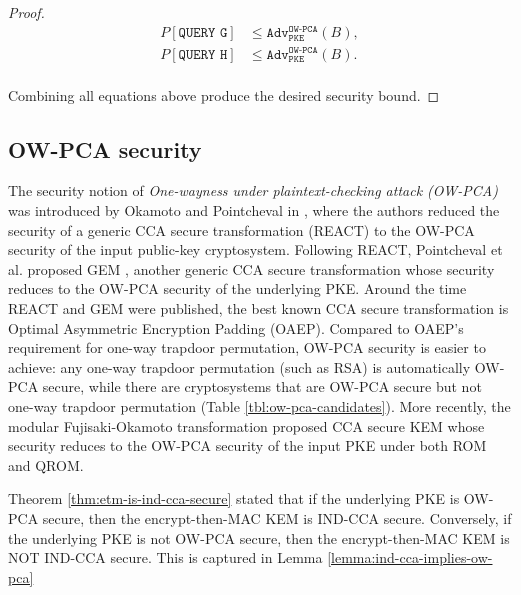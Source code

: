 \documentclass[runningheads]{llncs}
\newcommand{\pke}{\texttt{PKE}}
\newcommand{\adv}{\texttt{Adv}}
\begin{document}
\begin{proof}
    \begin{equation*}
        \begin{aligned}
            P\left[\texttt{QUERY G}\right] &\leq \adv^\texttt{OW-PCA}_\pke(B), \\
            P\left[\texttt{QUERY H}\right] &\leq \adv^\texttt{OW-PCA}_\pke(B). \\
        \end{aligned}
    \end{equation*}

    Combining all equations above produce the desired security bound.
\end{proof}

\subsection{OW-PCA security}\label{sec:ow-pca-security}
The security notion of \textit{One-wayness under plaintext-checking attack (OW-PCA)} was introduced by Okamoto and Pointcheval in \cite{DBLP:conf/ctrsa/OkamotoP01}, where the authors reduced the security of a generic CCA secure transformation (REACT) to the OW-PCA security of the input public-key cryptosystem. Following REACT, Pointcheval et al. proposed GEM \cite{DBLP:conf/ctrsa/CoronHJPPT02}, another generic CCA secure transformation whose security reduces to the OW-PCA security of the underlying PKE. Around the time REACT and GEM were published, the best known CCA secure transformation is Optimal Asymmetric Encryption Padding (OAEP)\cite{DBLP:conf/eurocrypt/BellareR94}. Compared to OAEP's requirement for one-way trapdoor permutation, OW-PCA security is easier to achieve: any one-way trapdoor permutation (such as RSA) is automatically OW-PCA secure, while there are cryptosystems that are OW-PCA secure but not one-way trapdoor permutation (Table \ref{tbl:ow-pca-candidates}). More recently, the modular Fujisaki-Okamoto transformation \cite{DBLP:conf/tcc/HofheinzHK17} proposed CCA secure KEM whose security reduces to the OW-PCA security of the input PKE under both ROM and QROM.

Theorem \ref{thm:etm-is-ind-cca-secure} stated that if the underlying PKE is OW-PCA secure, then the encrypt-then-MAC KEM is IND-CCA secure. Conversely, if the underlying PKE is not OW-PCA secure, then the encrypt-then-MAC KEM is NOT IND-CCA secure. This is captured in Lemma \ref{lemma:ind-cca-implies-ow-pca}
\end{document}

